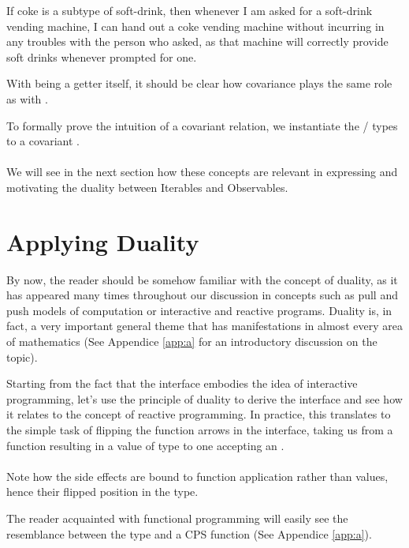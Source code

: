 If coke is a subtype of soft-drink, then whenever I am asked for a soft-drink vending machine, I can hand out a coke vending machine without incurring in any troubles with the person who asked, as that machine will correctly provide soft drinks whenever prompted for one.

With  being a getter itself, it should be clear how covariance plays the same role as with .

To formally prove the intuition of a covariant relation, we instantiate the / types to a covariant .\\

\\

We will see in the next section how these concepts are relevant in expressing and motivating the duality between Iterables and Observables.

\section{Applying Duality}
\label{sec:applyingduality}

By now, the reader should be somehow familiar with the concept of duality, as it has appeared many times throughout our discussion in concepts such as pull and push models of computation or interactive and reactive programs. Duality is, in fact, a very important general theme that has manifestations in almost every area of mathematics\cite{gowers2010princeton} (See Appendice \ref{app:a} for an introductory discussion on the topic). 

Starting from the fact that the  interface embodies the idea of interactive programming, let's use the principle of duality to derive the  interface and see how it relates to the concept of reactive programming. In practice, this translates to the simple task of flipping the function arrows in the  interface, taking us from a function resulting in a value of type  to one accepting an .\\

\\

Note how the side effects are bound to function application rather than values, hence their flipped position in the  type.

The reader acquainted with functional programming will easily see the resemblance between the  type and a CPS function (See Appendice \ref{app:a}).\\

